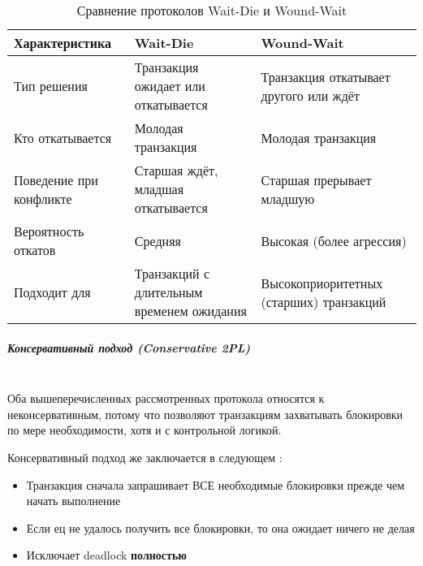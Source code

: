  \begin{table}[H]
     \centering
     \caption{Сравнение протоколов Wait-Die и Wound-Wait}
     \begin{tabular}{|l|p{5.25cm}|p{5.25cm}|}
         \hline
         \textbf{Характеристика} & \textbf{Wait-Die} & \textbf{Wound-Wait} \\
         \hline
         Тип решения & Транзакция ожидает или откатывается & Транзакция откатывает другого или ждёт \\
         \hline
         Кто откатывается & Молодая транзакция & Молодая транзакция \\
         \hline
         Поведение при конфликте & Старшая ждёт, младшая откатывается & Старшая прерывает младшую \\
         \hline
         Вероятность откатов & Средняя & Высокая (более агрессия) \\
         \hline
         Подходит для & Транзакций с длительным временем ожидания & Высокоприоритетных (старших) транзакций \\
         \hline
     \end{tabular}
 \end{table}
 
 \subparagraph{Консервативный подход (Conservative 2PL)} ~\\
 Оба вышеперечисленных рассмотренных протокола относятся к неконсервативным, потому что позволяют транзакциям захватывать блокировки по мере необходимости, хотя и с контрольной логикой.
 
 Консервативный подход же заключается в следующем \autocite{Silberschatz, ElmasriNavathe}:
 \begin{itemize}
     \item Транзакция сначала запрашивает ВСЕ необходимые блокировки прежде чем начать выполнение
     \item Если ец не удалось получить все блокировки, то она ожидает ничего не делая
     \item Исключает deadlock \textbf{полностью}
 \end{itemize}
 
